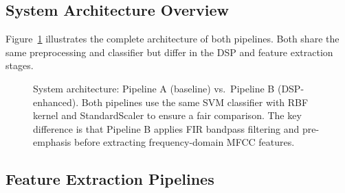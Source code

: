 \subsection{System Architecture Overview}

Figure~\ref{fig:pipeline_overview} illustrates the complete architecture of both pipelines. Both share the same preprocessing and classifier but differ in the DSP and feature extraction stages.

\begin{figure}[ht]
\centering
\small
{}
\caption{System architecture: Pipeline A (baseline) vs.\ Pipeline B (DSP-enhanced). Both pipelines use the same SVM classifier with RBF kernel and StandardScaler to ensure a fair comparison. The key difference is that Pipeline B applies FIR bandpass filtering and pre-emphasis before extracting frequency-domain MFCC features.}
\label{fig:pipeline_overview}
\end{figure}

\subsection{Feature Extraction Pipelines}

